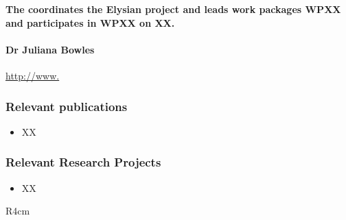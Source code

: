 \documentclass[a4paper,11pt]{article}
\newcommand{\project}[1]{\textbf{#1}\xspace}
\newcommand{\SECURITY}{\project{Elysian}}
\newcommand{\TheProject}{\SECURITY}
\begin{document}
\vspace{10pt}
\textbf{The \SAlong{} coordinates the \TheProject{} project and
leads work packages WPXX and participates in WPXX on XX.}
\vspace{10pt}

\paragraph{Dr Juliana Bowles} \url{http://www.}


\subsubsection*{Relevant publications}
\begin{itemize}
\item XX
\end{itemize}

\pagebreak
\subsubsection*{Relevant Research Projects}

\begin{itemize}
\item XX
\end{itemize}



\begin{wrapfigure}{R}{4cm}
\vspace{-2cm}
\hfill {}
\vspace{-1cm}
\end{wrapfigure}

\ 
\end{document}

